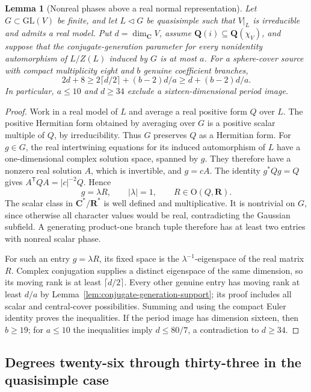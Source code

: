 \documentclass[11pt]{article}
\newtheorem{lemma}[theorem]{Lemma}
\theoremstyle{definition}
\theoremstyle{remark}
\newcommand{\Q}{\mathbf Q}
\begin{document}
\begin{lemma}[Nonreal phases above a real normal representation]
\label{lem:real-model-phase}
Let $G\subset\mathrm{GL}(V)$ be finite, and let
$L\triangleleft G$ be quasisimple such that $V|_L$ is irreducible
and admits a real model.  Put $d=\dim_{\mathbf C}V$, assume
$\Q(i)\subseteq\Q(\chi_V)$, and suppose that the
conjugate-generation parameter for every nonidentity automorphism
of $L/Z(L)$ induced by $G$ is at most $a$.
For a sphere-cover source with compact multiplicity eight and
$b$ genuine coefficient branches,
\[
 2d+8\geq2\lceil d/2\rceil+(b-2)d/a
       \geq d+(b-2)d/a.
\]
In particular, $a\leq10$ and $d\geq34$ exclude a
sixteen-dimensional period image.
\end{lemma}

\begin{proof}
Work in a real model of $L$ and average a real positive form
$Q$ over $L$.  The positive Hermitian form obtained by averaging
over $G$ is a positive scalar multiple of $Q$, by irreducibility.
Thus $G$ preserves $Q$ as a Hermitian form.  For $g\in G$,
the real intertwining equations for its induced automorphism of
$L$ have a one-dimensional complex solution space, spanned by
$g$.  They therefore have a nonzero real solution $A$, which
is invertible, and $g=cA$.  The identity $g^*Qg=Q$ gives
$A^{\mathsf T}QA=|c|^{-2}Q$.  Hence
\[
 g=\lambda R,\qquad |\lambda|=1,
 \qquad R\in\mathrm O(Q,\mathbf R).
\]
The scalar class in $\mathbf C^*/\mathbf R^*$ is well defined
and multiplicative.  It is nontrivial on $G$, since otherwise
all character values would be real, contradicting the Gaussian
subfield.  A generating product-one branch tuple therefore has
at least two entries with nonreal scalar phase.

For such an entry $g=\lambda R$, its fixed space is the
$\lambda^{-1}$-eigenspace of the real matrix $R$.  Complex
conjugation supplies a distinct eigenspace of the same dimension,
so its moving rank is at least $\lceil d/2\rceil$.
Every other genuine entry has moving rank at least $d/a$ by
Lemma~\ref{lem:conjugate-generation-support}; its proof includes
all scalar and central-cover possibilities.  Summing and using
the compact Euler identity proves the inequalities.
If the period image has dimension sixteen, then $b\geq19$;
for $a\leq10$ the inequalities imply $d\leq80/7$, a
contradiction to $d\geq34$.
\end{proof}


\subsection{Degrees twenty-six through thirty-three in the quasisimple case}
\end{document}
